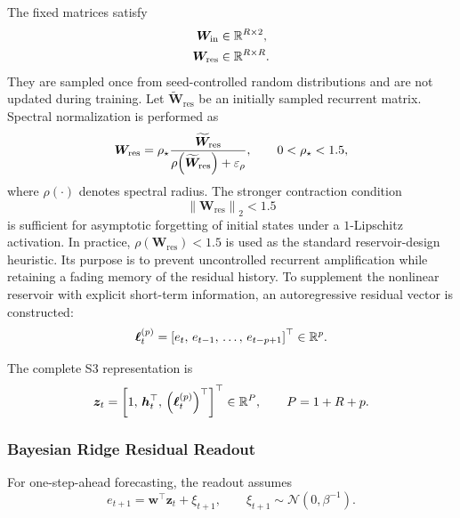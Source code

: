 \documentclass[review,number,sort&compress]{elsarticle}
\begin{document}
The fixed matrices satisfy
\begin{align}
    \bm{W}_{\mathrm{in}}
    &\in
    \mathbb{R}^{R\times2},
    \\
    \bm{W}_{\mathrm{res}}
    &\in
    \mathbb{R}^{R\times R}.
\end{align}
They are sampled once from seed-controlled random distributions and are not
updated during training.
Let $\widetilde{\bm{W}}_{\mathrm{res}}$ be an initially sampled recurrent
matrix. Spectral normalization is performed as
\begin{equation}
    \bm{W}_{\mathrm{res}}
    =
    \rho_\star
    \frac{
        \widetilde{\bm{W}}_{\mathrm{res}}
    }{
        \rho\!\left(
        \widetilde{\bm{W}}_{\mathrm{res}}
        \right)+\varepsilon_\rho
    },
    \qquad
    0<\rho_\star<1.5,
    \label{eq:spectral_normalization}
\end{equation}
where $\rho(\cdot)$ denotes spectral radius.
The stronger contraction condition
\begin{equation}
    \left\|
    \bm{W}_{\mathrm{res}}
    \right\|_2
    <1.5
\end{equation}
is sufficient for asymptotic forgetting of initial states under a
$1$-Lipschitz activation. In practice,
$\rho(\bm{W}_{\mathrm{res}})<1.5$ is used as the standard reservoir-design
heuristic. Its purpose is to prevent uncontrolled recurrent amplification while
retaining a fading memory of the residual history.
To supplement the nonlinear reservoir with explicit short-term information, an
autoregressive residual vector is constructed:
\begin{equation}
    \bm{\ell}_t^{(p)}
    =
    \left[
    e_t,\,
    e_{t-1},\,
    \ldots,\,
    e_{t-p+1}
    \right]^\top
    \in\mathbb{R}^p.
\end{equation}

The complete S3 representation is
\begin{equation}
    \bm{z}_t
    =
    \left[
    1,\,
    \bm{h}_t^\top,\,
    \left(\bm{\ell}_t^{(p)}\right)^\top
    \right]^\top
    \in
    \mathbb{R}^{P},
    \qquad
    P=1+R+p.
    \label{eq:s3_representation}
\end{equation}

\subsubsection{Bayesian Ridge Residual Readout}

For one-step-ahead forecasting, the readout assumes
\begin{equation}
    e_{t+1}
    =
    \bm{w}^\top\bm{z}_t
    +
    \xi_{t+1},
    \qquad
    \xi_{t+1}
    \sim
    \mathcal{N}(0,\beta^{-1}).
    \label{eq:bayesian_likelihood}
\end{equation}
\end{document}
